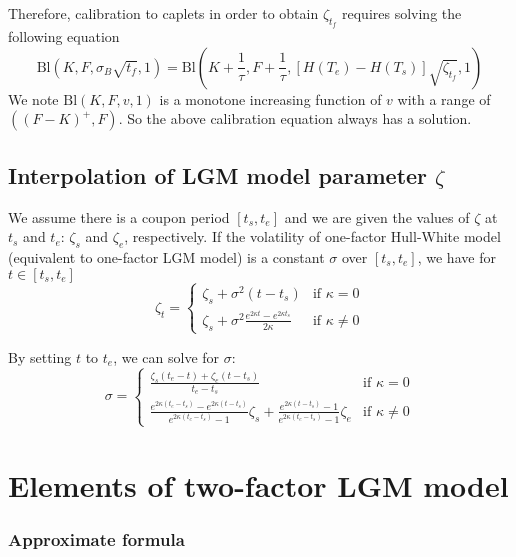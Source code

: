 \documentclass[10pt]{article}
\theoremstyle{plain}
\numberwithin{equation}{section}
\numberwithin{table}{section}
\begin{document}
Therefore, calibration to caplets in order to obtain $\zeta_{t_f}$ requires solving the following equation
\[
\boxed{
\mbox{Bl}(K, F, \sigma_B\sqrt{t_f}, 1) = \mbox{Bl}\left(K+\frac{1}{\tau}, F+\frac{1}{\tau}, \left[H(T_e)-H(T_s)\right] \sqrt{\zeta_{t_f}}, 1\right)
}
\]
We note $\mbox{Bl}(K, F, v, 1)$ is a monotone increasing function of $v$ with a range of $((F-K)^+, F)$. So the above calibration equation always has a solution.

\subsection{Interpolation of LGM model parameter $\zeta$}

We assume there is a coupon period $[t_s, t_e]$ and we are given the values of $\zeta$ at $t_s$ and $t_e$:
$\zeta_s$ and $\zeta_e$, respectively. If the volatility of one-factor Hull-White model (equivalent to one-factor
LGM model) is a constant $\sigma$ over $[t_s, t_e]$, we have for $t\in [t_s, t_e]$
\[
\zeta_t =
\begin{cases}
\zeta_s + \sigma^2(t-t_s) & \mbox{if $\kappa=0$} \\
\zeta_s + \sigma^2 \frac{e^{2\kappa t} - e^{2\kappa t_s}}{2\kappa} & \mbox{if $\kappa \ne 0$}
\end{cases}
\]

By setting $t$ to $t_e$, we can solve for $\sigma$:
\[
\sigma =
\begin{cases}
\frac{\zeta_s(t_e-t)+\zeta_e(t-t_s)}{t_e-t_s} & \mbox{if $\kappa=0$} \\
\frac{e^{2\kappa(t_e-t_s)} - e^{2\kappa(t-t_s)}}{e^{2\kappa(t_e-t_s)}-1}\zeta_s + \frac{e^{2\kappa(t-t_s)}-1}{e^{2\kappa(t_e-t_s)}-1}\zeta_e & \mbox{if $\kappa \ne 0$}
\end{cases}
\]

\section{Elements of two-factor LGM model}\label{sect_LGM2F}

\subsubsection{Approximate formula}
\end{document}
